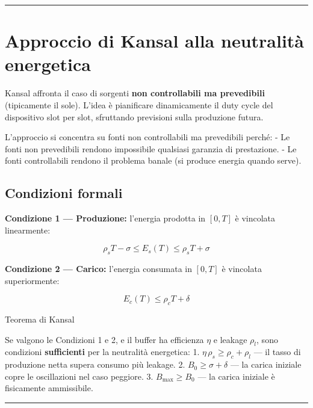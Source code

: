\documentclass[
  italian,
  openany]{book}
\begin{document}
\begin{center}\rule{0.5\linewidth}{0.5pt}\end{center}

\section{Approccio di Kansal alla neutralità
energetica}\label{approccio-di-kansal-alla-neutralituxe0-energetica}

Kansal affronta il caso di sorgenti \textbf{non controllabili ma
prevedibili} (tipicamente il sole). L'idea è pianificare dinamicamente
il duty cycle del dispositivo slot per slot, sfruttando previsioni sulla
produzione futura.

L'approccio si concentra su fonti non controllabili ma prevedibili
perché: - Le fonti non prevedibili rendono impossibile qualsiasi
garanzia di prestazione. - Le fonti controllabili rendono il problema
banale (si produce energia quando serve).

\subsection{Condizioni formali}\label{condizioni-formali}

\textbf{Condizione 1 --- Produzione:} l'energia prodotta in \([0, T]\) è
vincolata linearmente:

\[\rho_s T - \sigma \leq E_s(T) \leq \rho_s T + \sigma\]

\textbf{Condizione 2 --- Carico:} l'energia consumata in \([0, T]\) è
vincolata superiormente:

\[E_c(T) \leq \rho_c T + \delta\]

\begin{callouttheorem}{Teorema di Kansal}

Se valgono le Condizioni 1 e 2, e il buffer ha efficienza \(\eta\) e
leakage \(\rho_l\), sono condizioni \textbf{sufficienti} per la
neutralità energetica: 1. \(\eta\,\rho_s \geq \rho_c + \rho_l\) --- il
tasso di produzione netta supera consumo più leakage. 2.
\(B_0 \geq \sigma + \delta\) --- la carica iniziale copre le
oscillazioni nel caso peggiore. 3. \(B_{\mathrm{max}} \geq B_0\) --- la
carica iniziale è fisicamente ammissibile.

\end{callouttheorem}

\begin{center}\rule{0.5\linewidth}{0.5pt}\end{center}
\end{document}
